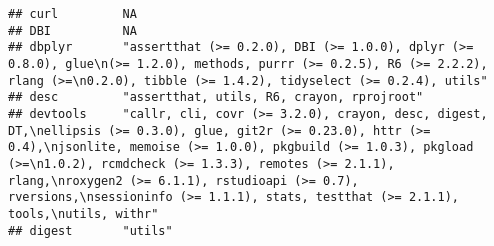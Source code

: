 \documentclass[]{book}
\begin{document}
\begin{verbatim}
## curl         NA                                                                                                                                                                                                                                                                                                                                                                                                                                                                                                          
## DBI          NA                                                                                                                                                                                                                                                                                                                                                                                                                                                                                                          
## dbplyr       "assertthat (>= 0.2.0), DBI (>= 1.0.0), dplyr (>= 0.8.0), glue\n(>= 1.2.0), methods, purrr (>= 0.2.5), R6 (>= 2.2.2), rlang (>=\n0.2.0), tibble (>= 1.4.2), tidyselect (>= 0.2.4), utils"                                                                                                                                                                                                                                                                                                                   
## desc         "assertthat, utils, R6, crayon, rprojroot"                                                                                                                                                                                                                                                                                                                                                                                                                                                                  
## devtools     "callr, cli, covr (>= 3.2.0), crayon, desc, digest, DT,\nellipsis (>= 0.3.0), glue, git2r (>= 0.23.0), httr (>= 0.4),\njsonlite, memoise (>= 1.0.0), pkgbuild (>= 1.0.3), pkgload (>=\n1.0.2), rcmdcheck (>= 1.3.3), remotes (>= 2.1.1), rlang,\nroxygen2 (>= 6.1.1), rstudioapi (>= 0.7), rversions,\nsessioninfo (>= 1.1.1), stats, testthat (>= 2.1.1), tools,\nutils, withr"                                                                                                                            
## digest       "utils"                                                                                                                                                                                                                                                                                                                                                                                                                                                                                                     

\end{verbatim}
\end{document}
